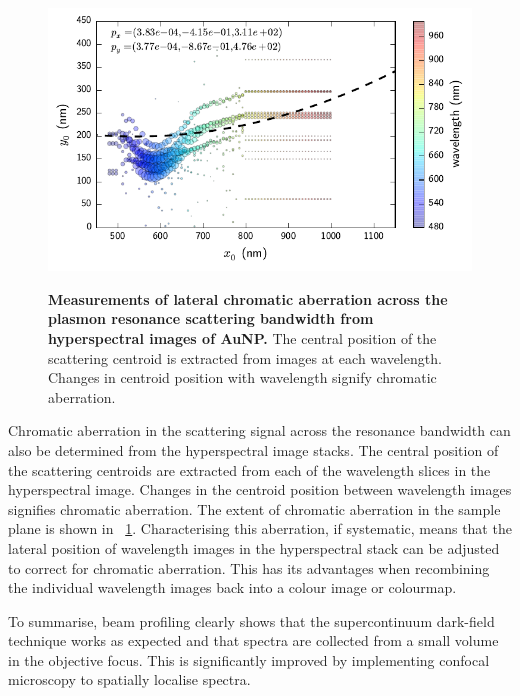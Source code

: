 \documentclass{article}
\begin{document}
\begin{figure}[bt]
\centering
{\includegraphics{figures/lateral_chromatic_aberration}}
{\caption[Measurements of lateral chromatic aberration across the plasmon resonance scattering bandwidth from hyperspectral images of AuNP.]{\textbf{Measurements of lateral chromatic aberration across the plasmon resonance scattering bandwidth from hyperspectral images of AuNP.} The central position of the scattering centroid is extracted from images at each wavelength. Changes in centroid position with wavelength signify chromatic aberration.}
\label{fig:lateral_chromatic_aberration}}
\end{figure}

Chromatic aberration in the scattering signal across the resonance bandwidth can also be determined from the hyperspectral image stacks. The central position of the scattering centroids are extracted from each of the wavelength slices in the hyperspectral image. Changes in the centroid position between wavelength images signifies chromatic aberration. The extent of chromatic aberration in the sample plane is shown in \figurename~\ref{fig:lateral_chromatic_aberration}.
Characterising this aberration, if systematic, means that the lateral position of wavelength images in the hyperspectral stack can be adjusted to correct for chromatic aberration. This has its advantages when recombining the individual wavelength images back into a colour image or colourmap.

To summarise, beam profiling clearly shows that the supercontinuum dark-field technique works as expected and that spectra are collected from a small volume in the objective focus. This is significantly improved by implementing confocal microscopy to spatially localise spectra.

\FloatBarrier
\end{document}
